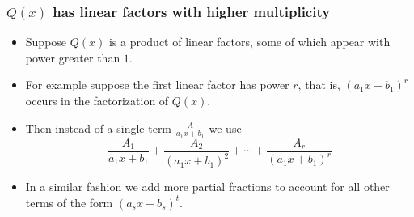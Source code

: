\begin{frame}
\frametitle{$Q(x)$ has linear factors with higher multiplicity}
\begin{itemize}
\item Suppose $Q(x)$ is a product of linear factors, some of which appear with power greater than $1$.
\item<2-> For example suppose the first linear factor has power $r$, that is, $(a_1x+b_1)^r$ occurs in the factorization of $Q(x)$.
\item<3-> Then instead of a single term $\frac{A}{a_1x+b_1}$ we use
\[
\frac{A_1}{a_1x+b_1}%
 + \frac{A_2}{(a_1x+b_1)^2}%
 + \cdots %
 + \frac{A_r}{(a_1x+b_1)^r}%
\]
\item<4-> In a similar fashion we add more partial fractions to account for all other terms of the form $(a_sx+b_s)^{t}$.
\end{itemize}
\end{frame}
